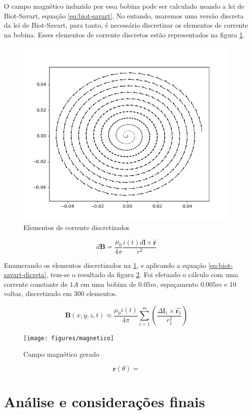 \documentclass[
	article,			%
	11pt,				%
	oneside,			%
	a4paper,			%
	english,			%
	brazil,				%
	sumario=tradicional
	]{abntex2}
\begin{document}
O campo magnético induzido por essa bobina pode ser calculado usando a lei de Biot-Savart, equação \ref{eq:biot-savart}. No entando, usaremos uma versão discreta da lei de Biot-Savart, para tanto, é necessário discretizar os elementos de corrente na bobina. Esses elementos de corrente discretos estão representados na figura \ref{fig:elementosdecondutor}.

\begin{figure}[h]
	\centering
	\includegraphics[width=0.7\linewidth]{figures/elementosdecondutor}
	\caption[Elementos de corrente discretizados]{Elementos de corrente discretizados}
	\label{fig:elementosdecondutor}
\end{figure}

\begin{equation} \label{eq:biot-savart}
	d\textbf{B} = \frac{\mu_0}{4\pi} \frac{i(t)d\textbf{l} \times \hat{\textbf{r}}}{r^2}
\end{equation}

Enumerando os elementos discretizados na \ref{fig:elementosdecondutor}, e aplicando a equação \ref{eq:biot-savart-dicreta}, tem-se o resultado da figura \ref{fig:magnetico}. Foi efetuado o cálculo com uma corrente constante de $ 1 A $ em uma bobina de $ 0.05 m $, espaçamento $ 0.005 m $ e 10 voltas, discretizado em 300 elementos.

\begin{equation} \label{eq:biot-savart-dicreta}
	\textbf{B}(x, y, z, t) \approx \frac{\mu_0i(t)}{4\pi} \sum_{i = 1}^{m} \left( \frac{\Delta\textbf{l}_1 \times \hat{\textbf{r}_1}}{r_1^2} \right)
\end{equation}

\begin{figure}[h]
	\centering
	\texttt{[image: figures/magnetico]}
	\caption[Campo magnético gerado]{Campo magnético gerado}
	\label{fig:magnetico}
\end{figure}

\begin{equation}
	\textbf{r} (\theta) = 
\end{equation}


\section{Análise e considerações finais}




\end{document}
